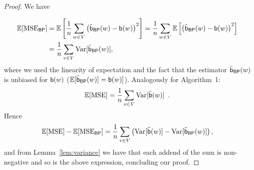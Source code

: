 \begin{proof}
  We have

  \begin{align*}
  \mathbb{E}[\mathrm{MSE}_\mathsf{BP}] &= \mathbb{E}\left[\frac{1}{n}\sum_{w\in
  V}\left(\tilde{\mathsf{b}}_\mathsf{BP}(w)-\mathsf{b}(w)\right)^2\right]=\frac{1}{n}\sum_{w\in
  V}\mathbb{E}\left[\left(\tilde{\mathsf{b}}_\mathsf{BP}(w)-\mathsf{b}(w)\right)^2\right]\\
  &=\frac{1}{n}\sum_{v\in V}\mathrm{Var}[\tilde{\mathsf{b}}_\mathsf{BP}(w)],
  \end{align*}
  where we used the linearity of expectation and the fact that the estimator
  $\tilde{\mathsf{b}}_\mathsf{BP}(w)$ is unbiased for $\mathsf{b}(w)$ ($\mathbb{E}[\tilde{\mathsf{b}}_\mathsf{BP}(w)]=\mathsf{b}(w)]$).
  Analogously for Algorithm~1:
  \[
  \mathbb{E}[\mathrm{MSE}] = \frac{1}{n}\sum_{v\in V}\mathrm{Var}[\tilde{\mathsf{b}}(w)]\enspace.
  \]
  Hence
  \[
  \mathbb{E}[\mathrm{MSE}]-\mathbb{E}[\mathrm{MSE}_\mathsf{BP}]=\frac{1}{n}\sum_{v\in
  V}\left(\mathrm{Var}[\tilde{\mathsf{b}}(w)]-\mathrm{Var}[\tilde{\mathsf{b}}_\mathsf{BP}(w)]\right),
  \]
  and from Lemma~\ref{lem:variance} we have that each addend of the sum is
  non-negative and so is the above expression, concluding our proof.
\end{proof}

